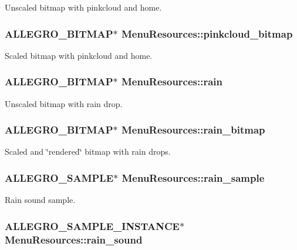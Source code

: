 Unscaled bitmap with pinkcloud and home. \hypertarget{structMenuResources_a321c3df303778319e85ed6477377ae73}{
\subsubsection[{pinkcloud\+\_\+bitmap}]{\setlength{\rightskip}{0pt plus 5cm}A\+L\+L\+E\+G\+R\+O\+\_\+\+B\+I\+T\+M\+A\+P$\ast$ Menu\+Resources\+::pinkcloud\+\_\+bitmap}}\label{structMenuResources_a321c3df303778319e85ed6477377ae73}
Scaled bitmap with pinkcloud and home. \hypertarget{structMenuResources_afb9b34f1dea1440aa0171a06f9957e49}{
\subsubsection[{rain}]{\setlength{\rightskip}{0pt plus 5cm}A\+L\+L\+E\+G\+R\+O\+\_\+\+B\+I\+T\+M\+A\+P$\ast$ Menu\+Resources\+::rain}}\label{structMenuResources_afb9b34f1dea1440aa0171a06f9957e49}
Unscaled bitmap with rain drop. \hypertarget{structMenuResources_aa018f4cd7de72e3ddca03be279f655f2}{
\subsubsection[{rain\+\_\+bitmap}]{\setlength{\rightskip}{0pt plus 5cm}A\+L\+L\+E\+G\+R\+O\+\_\+\+B\+I\+T\+M\+A\+P$\ast$ Menu\+Resources\+::rain\+\_\+bitmap}}\label{structMenuResources_aa018f4cd7de72e3ddca03be279f655f2}
Scaled and \char`\"{}rendered\char`\"{} bitmap with rain drops. \hypertarget{structMenuResources_adf2448b5a6e212459cf17c1bcc1b6dd5}{
\subsubsection[{rain\+\_\+sample}]{\setlength{\rightskip}{0pt plus 5cm}A\+L\+L\+E\+G\+R\+O\+\_\+\+S\+A\+M\+P\+L\+E$\ast$ Menu\+Resources\+::rain\+\_\+sample}}\label{structMenuResources_adf2448b5a6e212459cf17c1bcc1b6dd5}
Rain sound sample. \hypertarget{structMenuResources_a5d1081472b68e6303298a3853e04f0b2}{
\subsubsection[{rain\+\_\+sound}]{\setlength{\rightskip}{0pt plus 5cm}A\+L\+L\+E\+G\+R\+O\+\_\+\+S\+A\+M\+P\+L\+E\+\_\+\+I\+N\+S\+T\+A\+N\+C\+E$\ast$ Menu\+Resources\+::rain\+\_\+sound}}\label{structMenuResources_a5d1081472b68e6303298a3853e04f0b2}
